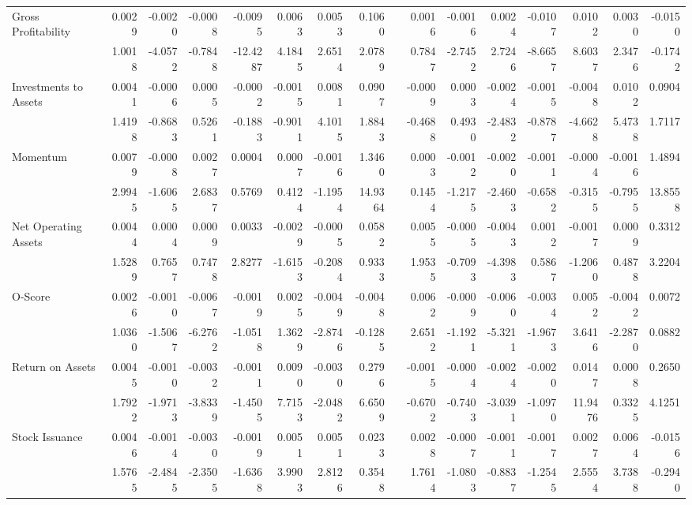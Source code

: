 \begin{table}[h]
{\begin{tabular}{lrrrrrrrrrrrrrrr}
Gross Profitability & 0.0029 & -0.0020 & -0.0008 & -0.0095 & 0.0063 & 0.0053 & 0.1060 &       & 0.0016 & -0.0016 & 0.0024 & -0.0107 & 0.0102 & 0.0030 & -0.0150 \\
& 1.0018 & -4.0572 & -0.7848 & -12.4287 & 4.1845 & 2.6514 & 2.0789 &       & 0.7847 & -2.7452 & 2.7246 & -8.6657 & 8.6037 & 2.3476 & -0.1742 \\
Investments to Assets & 0.0041 & -0.0006 & 0.0005 & -0.0002 & -0.0015 & 0.0081 & 0.0907 &       & -0.0009 & 0.0003 & -0.0024 & -0.0015 & -0.0048 & 0.0102 & 0.0904 \\
& 1.4198 & -0.8683 & 0.5261 & -0.1883 & -0.9011 & 4.1015 & 1.8843 &       & -0.4688 & 0.4930 & -2.4832 & -0.8787 & -4.6628 & 5.4738 & 1.7117 \\
Momentum & 0.0079 & -0.0008 & 0.0027 & 0.0004 & 0.0007 & -0.0016 & 1.3460 &       & 0.0003 & -0.0012 & -0.0020 & -0.0011 & -0.0004 & -0.0016 & 1.4894 \\
& 2.9945 & -1.6065 & 2.6837 & 0.5769 & 0.4124 & -1.1954 & 14.9364 &       & 0.1454 & -1.2175 & -2.4603 & -0.6582 & -0.3155 & -0.7955 & 13.8558 \\
Net Operating Assets & 0.0044 & 0.0004 & 0.0009 & 0.0033 & -0.0029 & -0.0005 & 0.0582 &       & 0.0055 & -0.0005 & -0.0043 & 0.0012 & -0.0017 & 0.0009 & 0.3312 \\
& 1.5289 & 0.7657 & 0.7478 & 2.8277 & -1.6153 & -0.2084 & 0.9333 &       & 1.9535 & -0.7093 & -4.3983 & 0.5867 & -1.2060 & 0.4878 & 3.2204 \\
O-Score & 0.0026 & -0.0010 & -0.0067 & -0.0019 & 0.0025 & -0.0049 & -0.0048 &       & 0.0062 & -0.0009 & -0.0060 & -0.0034 & 0.0052 & -0.0042 & 0.0072 \\
& 1.0360 & -1.5067 & -6.2762 & -1.0518 & 1.3629 & -2.8746 & -0.1285 &       & 2.6512 & -1.1921 & -5.3211 & -1.9673 & 3.6416 & -2.2870 & 0.0882 \\
Return on Assets & 0.0045 & -0.0010 & -0.0032 & -0.0011 & 0.0090 & -0.0030 & 0.2796 &       & -0.0015 & -0.0004 & -0.0024 & -0.0020 & 0.0147 & 0.0008 & 0.2650 \\
& 1.7922 & -1.9713 & -3.8339 & -1.4505 & 7.7153 & -2.0482 & 6.6509 &       & -0.6702 & -0.7403 & -3.0391 & -1.0970 & 11.9476 & 0.3325 & 4.1251 \\
Stock Issuance & 0.0046 & -0.0014 & -0.0030 & -0.0019 & 0.0051 & 0.0051 & 0.0233 &       & 0.0028 & -0.0007 & -0.0011 & -0.0017 & 0.0027 & 0.0064 & -0.0156 \\
& 1.5765 & -2.4845 & -2.3505 & -1.6368 & 3.9903 & 2.8126 & 0.3548 &       & 1.7614 & -1.0803 & -0.8837 & -1.2545 & 2.5554 & 3.7388 & -0.2940 \\
\bottomrule
\end{tabular}%
}
\label{tab:epu-ff6}%
\end{table}%

